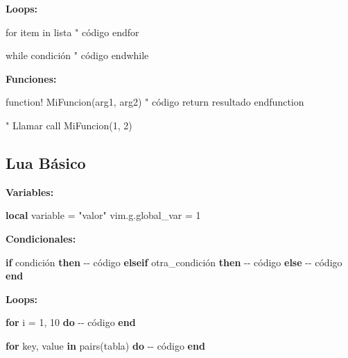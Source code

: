 \documentclass[
  doc,
  floatsintext,
  longtable,
  a4paper,
  nolmodern,
  notxfonts,
  notimes,
  12pt,
  colorlinks=true,linkcolor=blue,citecolor=blue,urlcolor=blue]{apa7}
\newenvironment{Shaded}{\begin{snugshade}}{\end{snugshade}}
\newcommand{\CommentTok}[1]{\textcolor[rgb]{0.37,0.37,0.37}{#1}}
\newcommand{\ControlFlowTok}[1]{\textcolor[rgb]{0.00,0.23,0.31}{\textbf{#1}}}
\newcommand{\DecValTok}[1]{\textcolor[rgb]{0.68,0.00,0.00}{#1}}
\newcommand{\FunctionTok}[1]{\textcolor[rgb]{0.28,0.35,0.67}{#1}}
\newcommand{\KeywordTok}[1]{\textcolor[rgb]{0.00,0.23,0.31}{\textbf{#1}}}
\newcommand{\NormalTok}[1]{\textcolor[rgb]{0.00,0.23,0.31}{#1}}
\newcommand{\OperatorTok}[1]{\textcolor[rgb]{0.37,0.37,0.37}{#1}}
\newcommand{\StringTok}[1]{\textcolor[rgb]{0.13,0.47,0.30}{#1}}
\newcommand{\VariableTok}[1]{\textcolor[rgb]{0.07,0.07,0.07}{#1}}
\begin{document}
\textbf{Loops:}

\begin{Shaded}
\begin{Highlighting}[]
\NormalTok{for item in lista}
\NormalTok{    " código}
\NormalTok{endfor}

\NormalTok{while condición}
\NormalTok{    " código}
\NormalTok{endwhile}
\end{Highlighting}
\end{Shaded}

\textbf{Funciones:}

\begin{Shaded}
\begin{Highlighting}[]
\NormalTok{function! MiFuncion(arg1, arg2)}
\NormalTok{    " código}
\NormalTok{    return resultado}
\NormalTok{endfunction}

\NormalTok{" Llamar}
\NormalTok{call MiFuncion(1, 2)}
\end{Highlighting}
\end{Shaded}

\subsection{Lua Básico}\label{lua-buxe1sico}

\textbf{Variables:}

\begin{Shaded}
\begin{Highlighting}[]
\KeywordTok{local} \VariableTok{variable} \OperatorTok{=} \StringTok{"valor"}
\VariableTok{vim}\OperatorTok{.}\VariableTok{g}\OperatorTok{.}\VariableTok{global\_var} \OperatorTok{=} \DecValTok{1}
\end{Highlighting}
\end{Shaded}

\textbf{Condicionales:}

\begin{Shaded}
\begin{Highlighting}[]
\ControlFlowTok{if} \VariableTok{condici}\NormalTok{ó}\VariableTok{n} \ControlFlowTok{then}
    \CommentTok{{-}{-} código}
\ControlFlowTok{elseif} \VariableTok{otra\_condici}\NormalTok{ó}\VariableTok{n} \ControlFlowTok{then}
    \CommentTok{{-}{-} código}
\ControlFlowTok{else}
    \CommentTok{{-}{-} código}
\ControlFlowTok{end}
\end{Highlighting}
\end{Shaded}

\textbf{Loops:}

\begin{Shaded}
\begin{Highlighting}[]
\ControlFlowTok{for} \VariableTok{i} \OperatorTok{=} \DecValTok{1}\OperatorTok{,} \DecValTok{10} \ControlFlowTok{do}
    \CommentTok{{-}{-} código}
\ControlFlowTok{end}

\ControlFlowTok{for} \VariableTok{key}\OperatorTok{,} \VariableTok{value} \KeywordTok{in} \FunctionTok{pairs}\OperatorTok{(}\VariableTok{tabla}\OperatorTok{)} \ControlFlowTok{do}
    \CommentTok{{-}{-} código}
\ControlFlowTok{end}
\end{Highlighting}
\end{Shaded}
\end{document}
